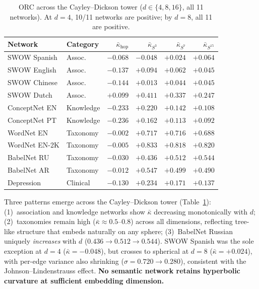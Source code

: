 \documentclass[11pt,a4paper]{article}
\newcommand{\kbar}{\bar{\kappa}}
\begin{document}
\begin{table}[t]
\centering
\caption{ORC across the Cayley--Dickson tower ($d \in \{4, 8, 16\}$, all 11 networks). At $d=4$, 10/11 networks are positive; by $d=8$, all 11 are positive.}
\label{tab:hypercomplex}
\small
\begin{tabular}{@{}llrrrr@{}}
\toprule
Network & Category & $\kbar_{\mathrm{hop}}$ & $\kbar_{S^3}$ & $\kbar_{S^7}$ & $\kbar_{S^{15}}$ \\
\midrule
SWOW Spanish & Assoc.\ & $-0.068$ & $-0.048$ & $+0.024$ & $+0.064$ \\
SWOW English & Assoc.\ & $-0.137$ & $+0.094$ & $+0.062$ & $+0.045$ \\
SWOW Chinese & Assoc.\ & $-0.144$ & $+0.013$ & $+0.044$ & $+0.045$ \\
SWOW Dutch & Assoc.\ & $+0.099$ & $+0.411$ & $+0.337$ & $+0.247$ \\
ConceptNet EN & Knowledge & $-0.233$ & $+0.220$ & $+0.142$ & $+0.108$ \\
ConceptNet PT & Knowledge & $-0.236$ & $+0.162$ & $+0.113$ & $+0.092$ \\
WordNet EN & Taxonomy & $-0.002$ & $+0.717$ & $+0.716$ & $+0.688$ \\
WordNet EN-2K & Taxonomy & $-0.005$ & $+0.833$ & $+0.818$ & $+0.820$ \\
BabelNet RU & Taxonomy & $-0.030$ & $+0.436$ & $+0.512$ & $+0.544$ \\
BabelNet AR & Taxonomy & $-0.012$ & $+0.547$ & $+0.499$ & $+0.490$ \\
Depression & Clinical & $-0.130$ & $+0.234$ & $+0.171$ & $+0.137$ \\
\bottomrule
\end{tabular}
\end{table}

Three patterns emerge across the Cayley--Dickson tower (Table~\ref{tab:hypercomplex}): (1)~association and knowledge networks show $\kbar$ decreasing monotonically with $d$; (2)~taxonomies remain high ($\kbar \approx 0.5$--$0.8$) across all dimensions, reflecting tree-like structure that embeds naturally on any sphere; (3)~BabelNet Russian uniquely \emph{increases} with $d$ ($0.436 \to 0.512 \to 0.544$). SWOW Spanish was the sole exception at $d=4$ ($\kbar = -0.048$), but crosses to spherical at $d=8$ ($\kbar = +0.024$), with per-edge variance also shrinking ($\sigma = 0.720 \to 0.280$), consistent with the Johnson--Lindenstrauss effect. \textbf{No semantic network retains hyperbolic curvature at sufficient embedding dimension.}
\end{document}
